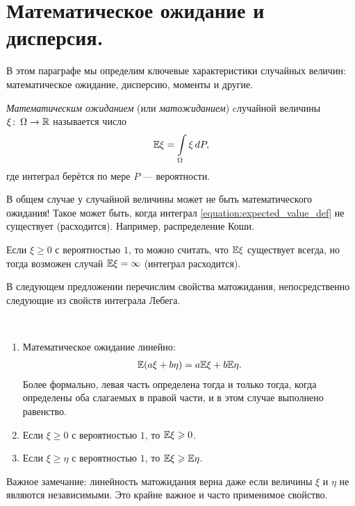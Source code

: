 \documentclass[../main.tex]{subfiles}
\begin{document}
\newpage
\section{Математическое ожидание и дисперсия.}

В этом параграфе мы определим ключевые характеристики случайных величин: математическое ожидание, дисперсию, моменты и другие.

\begin{df}
 \textit{Математическим ожиданием} (или \textit{матожиданием}) cлучайной величины $ \xi \colon \, \Omega \to \mathbb{R} $ называется число
 \begin{align}
  \label{equation:expected_value_def}
  \mathbb E \xi = \int\limits_{\Omega}  \xi\,dP,
 \end{align} где интеграл берётся по мере $ P $ --- вероятности.
\end{df}
\begin{remrk*}
 В общем случае у случайной величины может не быть математического ожидания! Такое может быть, когда интеграл \eqref{equation:expected_value_def} не существует (расходится). Например, распределение Коши.

 Если $ \xi \geqslant 0 $ с вероятностью $ 1 $, то можно считать, что $ \mathbb E \xi $ существует всегда, но тогда возможен случай $ \mathbb E \xi = \infty $ (интеграл расходится).
\end{remrk*}
В следующем предложении перечислим свойства матожидания, непосредственно следующие из свойств интеграла Лебега.
\begin{prop}\
 \begin{enumerate}
  \item Математическое ожидание линейно:
   \begin{align*}
    \mathbb E(a\xi + b\eta) = a \mathbb E \xi + b \mathbb E \eta.
   \end{align*} Более формально, левая часть определена тогда и только тогда, когда определены оба слагаемых в правой части, и в этом случае выполнено равенство.
  \item Если $ \xi \geqslant 0 $ с вероятностью $ 1 $, то $ \mathbb E\xi\geqslant 0 $.
  \item Если $ \xi \geqslant \eta $ с вероятностью $ 1 $, то $ \mathbb E\xi \geqslant \mathbb E\eta $.
 \end{enumerate}
\end{prop}

Важное замечание: линейность матожидания верна даже если величины $ \xi $ и $ \eta $ не являются независимыми. Это крайне важное и часто применимое свойство.
\end{document}
